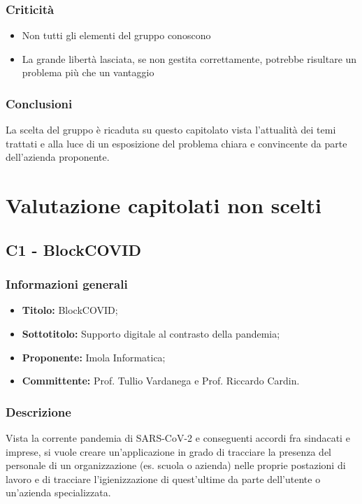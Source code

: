 \documentclass[]{article}
\begin{document}
			\subsubsection{Criticità}
			\begin{itemize}
				\item Non tutti gli elementi del gruppo conoscono 
				\item La grande libertà lasciata, se non gestita correttamente, potrebbe risultare un problema più che un vantaggio
			\end{itemize}

			\subsubsection{Conclusioni}
				La scelta del gruppo è ricaduta su questo capitolato vista l'attualità dei temi trattati e alla luce di un esposizione del problema chiara e convincente da parte dell'azienda proponente.
	\newpage

	\section{Valutazione capitolati non scelti}
		\subsection{C1 - BlockCOVID}
			\subsubsection{Informazioni generali}
			\begin{itemize}
				\item \textbf{Titolo:} BlockCOVID;
				\item \textbf{Sottotitolo:} Supporto digitale al contrasto della pandemia;
				\item \textbf{Proponente:} Imola Informatica;
				\item \textbf{Committente:} Prof. Tullio Vardanega e Prof. Riccardo Cardin.
			\end{itemize}

			\subsubsection{Descrizione}
			Vista la corrente pandemia di SARS-CoV-2 e conseguenti accordi fra sindacati e imprese, si vuole creare un'applicazione in grado di tracciare la presenza del personale di un organizzazione (es. scuola o azienda) nelle proprie postazioni di lavoro e di tracciare l'igienizzazione di quest'ultime da parte dell'utente o un'azienda specializzata.
\end{document}
